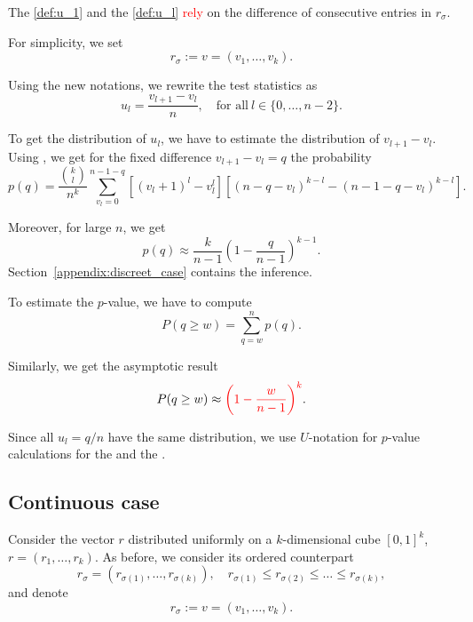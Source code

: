 \documentclass{llncs}
\begin{document}
The  \eqref{def:u_1} and the  \eqref{def:u_l} 
\textcolor{red}{rely} on the difference of consecutive entries in $r_{\sigma}$.

For simplicity, we set
\begin{equation}
\label{def:u}
    r_{\sigma} := v = (v_1, \dots, v_k).
\end{equation}

Using the new notations, we rewrite the test statistics as
\[
u_l = \frac{v_{l+1} - v_{l}}{n}, \quad
\text{for all}~ l\in \{0, \dots, n-2\}.
\]

To get the distribution of $u_l$, we have to estimate the distribution of $v_{l+1}- v_l$. Using \cite{khatri1962distributions}, we get
for the fixed difference $v_{l+1}-v_{l} = q$ the probability  
\[
p(q) = \frac{\binom{k}{l}}{n^k}\sum^{n-1-q}_{v_l = 0} \left[(v_l + 1)^{l} - v^l_l \right] \left[ (n-q-v_l)^{k-l} - (n-1-q-v_l)^{k-l}\right].
\]

Moreover, for large $n$, we get
\[
p(q) \approx \frac{k}{n-1}\left(1 - \frac{q}{n-1} \right)^{k-1}.
\]
Section~\ref{appendix:discreet_case} contains the inference.

To estimate the $p$-value, we have to compute
\[
P(q \ge w) = \sum^{n}_{q = w} p(q).
\]

Similarly, we get the asymptotic result
\[
P(q \ge w) \approx \textcolor{red}{\left(1 - \frac{w}{n-1} \right)^{k}}.
\]


Since all $u_l = q/n$ have the same distribution, we use $U$-notation for $p$-value calculations for the  and the .

\subsection{Continuous case}

Consider the vector $r$ distributed uniformly on a $k$-dimensional cube $[0, 1]^{k}$, $r = (r_1, \dots, r_k)$. As before, we consider its ordered counterpart
\[
r_{\sigma} = (r_{\sigma(1)}, \dots, r_{\sigma(k)}), \quad r_{\sigma(1)} \leq r_{\sigma(2)} \leq \dots \leq r_{\sigma(k)},
\]
and denote 
\[
    r_{\sigma} := v = (v_1, \dots, v_k).
\]
\end{document}
